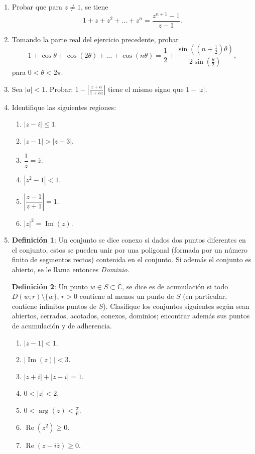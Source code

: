 \documentclass[11pt]{article}
\begin{document}
\begin{enumerate}
    \item Probar que para $z \neq 1$, se tiene
    \[
    1 + z + z^2 + \dots + z^n = \frac{z^{n+1} - 1}{z - 1}.
    \]

    \item Tomando la parte real del ejercicio precedente, probar
    \[
    1 + \cos \theta + \cos(2\theta) + \dots + \cos(n\theta) = \frac{1}{2} + \frac{\sin\left((n + \frac{1}{2})\theta\right)}{2 \sin\left(\frac{\theta}{2}\right)},
    \]
    para $0 < \theta < 2\pi$.

    \item Sea $|a| < 1$. Probar: $1 - \left| \frac{z + a}{1 + \overline{a}z} \right|$ tiene el mismo signo que $1 - |z|$.

    \item Identifique las siguientes regiones:
    \begin{enumerate}
        \item $|z - i| \leq 1$.
        \item $|z - 1| > |z - 3|$.
        \item $\dfrac{1}{z} = \overline{z}$.
        \item $|z^2 - 1| < 1$.
        \item $\left| \dfrac{z - 1}{z + 1} \right| = 1$.
        \item $|z|^2 = \operatorname{Im}(z)$.
    \end{enumerate}

    \item \textbf{Definición 1}: Un conjunto se dice conexo si dados dos puntos diferentes en el conjunto, estos se pueden unir por una poligonal (formada por un número finito de segmentos rectos) contenida en el conjunto. Si además el conjunto es abierto, se le llama entonces \textit{Dominio}.

    \textbf{Definición 2}: Un punto $w \in S \subset \mathbb{C}$, se dice es de acumulación si todo $D(w; r) \setminus \{w\}$, $r > 0$ contiene al menos un punto de $S$ (en particular, contiene infinitos puntos de $S$). Clasifique los conjuntos siguientes según sean abiertos, cerrados, acotados, conexos, dominios; encontrar además sus puntos de acumulación y de adherencia.
    \begin{enumerate}
        \item $|z - 1| < 1$.
        \item $|\operatorname{Im}(z)| < 3$.
        \item $|z + i| + |z - i| = 1$.
        \item $0 < |z| < 2$.
        \item $0 < \arg(z) < \frac{\pi}{6}$.
        \item $\operatorname{Re}(z^2) \geq 0$.
        \item $\operatorname{Re}(z - i \overline{z}) \geq 0$.
    \end{enumerate}
\end{enumerate}
\end{document}
